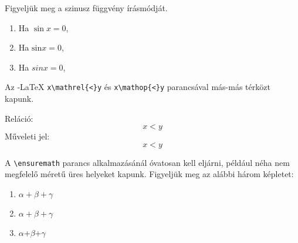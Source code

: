 \documentclass{article}
\begin{document}
Figyeljük meg a szinusz függvény írásmódját.
\begin{enumerate}
\item Ha $\sin x = 0$, \textellipsis
\item Ha $\mathrm{sin} x = 0$, \textellipsis
\item Ha $sin x = 0$, \textellipsis
\end{enumerate}

Az \AmS{}-\LaTeX{} \verb!x\mathrel{<}y! és  \verb!x\mathop{<}y! parancsával más-más térközt kapunk.

Reláció:
{\Huge
 $$ x\mathrel{<}y  $$
 }
Műveleti jel:
{\Huge$$ x\mathop{<}y  $$
}

A \verb!\ensuremath! parancs alkalmazásánál óvatosan kell eljárni, például néha nem megfelelő méretű üres helyeket kapunk. Figyeljük meg az alábbi három képletet:
\begin{enumerate}
\item $\alpha+\beta+\gamma$
\item \ensuremath{\alpha+\beta+\gamma}
\item \ensuremath{\alpha}+\ensuremath{\beta}+\ensuremath{\gamma}
\end{enumerate}
\end{document}
